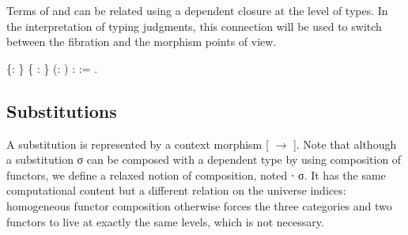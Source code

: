 
\begin{coqdoccode}
\end{coqdoccode}


  Terms of   and   can be related using a dependent closure
  at the level of types. In the interpretation of typing judgments, this connection 
  will be used to switch between the fibration and the morphism points of view.
\begin{coqdoccode}
\coqdocemptyline
\coqdocnoindent
{}  \{: \} \{ :  \} (:  )\coqdoceol
\coqdocindent{1.00em}
:   := \coqdocnotation{(} \coqdocvar{$\gamma$} \coqdocnotation{(}   \coqdocnotation{$\star$} \coqdocnotation{(}\coqdocvariable{$\gamma$}\coqdocnotation{;} \coqdocnotation{)} \coqdocnotation{;} \coqdocvar{\_}\coqdocnotation{);}  \coqdocnotation{)}.\coqdoceol
\coqdocemptyline
\end{coqdoccode}


\subsection{Substitutions}




  A substitution is represented by a context morphism [ $\longrightarrow$ ].  Note
  that although a substitution σ can be composed with a dependent type
   by using composition of functors, we define a relaxed notion of
  composition, noted  ⋅ σ. It has the same computational content but
  a different relation on the universe indices: homogeneous functor
  composition otherwise forces the three categories and two functors to
  live at exactly the same levels, which is not necessary.



